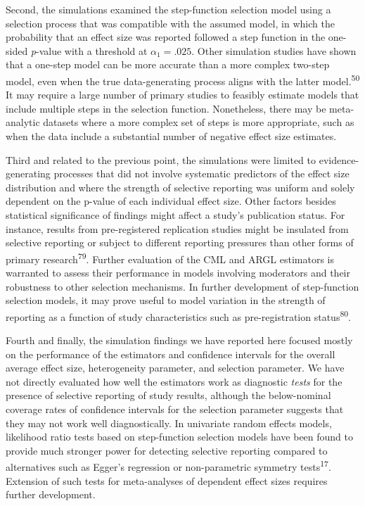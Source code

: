 \documentclass[
  american,
  man, donotrepeattitle,floatsintext]{apa7}
\begin{document}
Second, the simulations examined the step-function selection model using a selection process that was compatible with the assumed model, in which the probability that an effect size was reported followed a step function in the one-sided \emph{p}-value with a threshold at \(\alpha_1 = .025\).
Other simulation studies have shown that a one-step model can be more accurate than a more complex two-step model, even when the true data-generating process aligns with the latter model.\textsuperscript{50}
It may require a large number of primary studies to feasibly estimate models that include multiple steps in the selection function.
Nonetheless, there may be meta-analytic datasets where a more complex set of steps is more appropriate, such as when the data include a substantial number of negative effect size estimates.

Third and related to the previous point, the simulations were limited to evidence-generating processes that did not involve systematic predictors of the effect size distribution and where the strength of selective reporting was uniform and solely dependent on the p-value of each individual effect size.
Other factors besides statistical significance of findings might affect a study's publication status.
For instance, results from pre-registered replication studies might be insulated from selective reporting or subject to different reporting pressures than other forms of primary research\textsuperscript{79}.
Further evaluation of the CML and ARGL estimators is warranted to assess their performance in models involving moderators and their robustness to other selection mechanisms.
In further development of step-function selection models, it may prove useful to model variation in the strength of reporting as a function of study characteristics such as pre-registration status\textsuperscript{80}.

Fourth and finally, the simulation findings we have reported here focused mostly on the performance of the estimators and confidence intervals for the overall average effect size, heterogeneity parameter, and selection parameter.
We have not directly evaluated how well the estimators work as diagnostic \emph{tests} for the presence of selective reporting of study results, although the below-nominal coverage rates of confidence intervals for the selection parameter suggests that they may not work well diagnostically.
In univariate random effects models, likelihood ratio tests based on step-function selection models have been found to provide much stronger power for detecting selective reporting compared to alternatives such as Egger's regression or non-parametric symmetry tests\textsuperscript{17}.
Extension of such tests for meta-analyses of dependent effect sizes requires further development.
\end{document}
